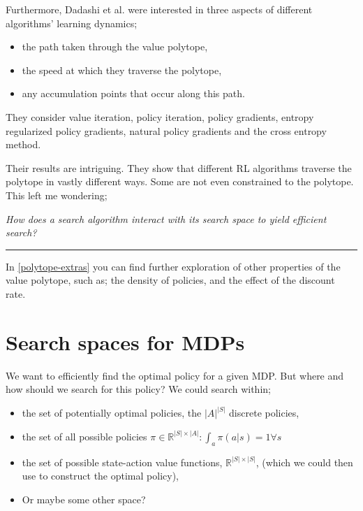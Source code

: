 Furthermore, Dadashi et al. \cite{Dadashi2018} were interested in three aspects of different algorithms’ learning dynamics;

\begin{itemize}
\tightlist
  \item the path taken through the value polytope,
  \item the speed at which they traverse the polytope,
  \item any accumulation points that occur along this path.
\end{itemize}


They consider value iteration, policy iteration, policy gradients, entropy regularized policy gradients,
natural policy gradients and the cross entropy method.

Their results are intriguing. They show that different RL algorithms traverse the polytope in vastly different ways.
Some are not even constrained to the polytope. This left me wondering;

\begin{displayquote}
  \textsl{How does a search algorithm interact with its search space to yield efficient search?}
\end{displayquote}

\begin{center}\rule{0.5\linewidth}{\linethickness}\end{center}

In \ref{polytope-extras} you can find further exploration of other properties of
the value polytope, such as; the density of policies, and the effect of the discount
rate.

\newpage
\section{Search spaces for MDPs}\label{search-spaces-mdps}

We want to efficiently find the optimal policy for a given MDP. But where and how should we
search for this policy? We could search within;

\begin{itemize}
\tightlist
  \item the set of potentially optimal policies, the $|A|^{|S|}$ discrete policies,
  \item the set of all possible policies $\pi \in \mathbb R^{|S| \times |A|}: \int_a \pi(a|s) = 1 \forall s $
  \item the set of possible state-action value functions, $\mathbb R^{|S|\times|S|}$,
  (which we could then use to construct the optimal policy),
  \item Or maybe some other space?
\end{itemize}

